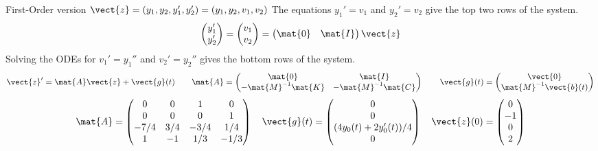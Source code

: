 \documentclass[11pt,aspectratio=169]{beamer}
\begin{document}
\begin{frame}{First-Order version 
		$\vect{z}=(y_1,y_2,y_1',y_2') =(y_1,y_2,v_1,v_2) $ }
The equations $y_1'=v_1$ and $y_2'=v_2$ give the top two rows of the system.
\[
  \begin{pmatrix}y_1'\\y_2'\end{pmatrix}
    =\begin{pmatrix}v_1\\v_2\end{pmatrix}
    =\begin{pmatrix}\mat{0}&\mat{I}\end{pmatrix}\vect{z}
\]
Solving the ODEs for $v_1'=y_1''$ and $v_2'=y_2''$
gives the bottom rows of the system.
\[
  \vect{z}'=\mat{A}\vect{z}+\vect{g}(t)
  \qquad
  \mat{A}=\begin{pmatrix}\mat{0}&\mat{I}\\-\mat{M}^{-1}\mat{K}&-\mat{M}^{-1}\mat{C}\end{pmatrix}
  \qquad
  \vect{g}(t)=\begin{pmatrix}\vect{0}\\\mat{M}^{-1}\vect{b}(t)\end{pmatrix}
\]
\[
  \mat{A}=\begin{pmatrix}
    0&0&1&0\\
    0&0&0&1\\
    -7/4&3/4&-3/4&1/4\\
    1&-1&1/3&-1/3
  \end{pmatrix}
  \quad
  \vect{g}(t)=\begin{pmatrix}0\\0\\(4y_0(t)+2y_0'(t))/4\\0\end{pmatrix}
  \quad
  \vect{z}(0)=\begin{pmatrix}0\\-1\\0\\2\end{pmatrix}
\]
\end{frame}
\end{document}
